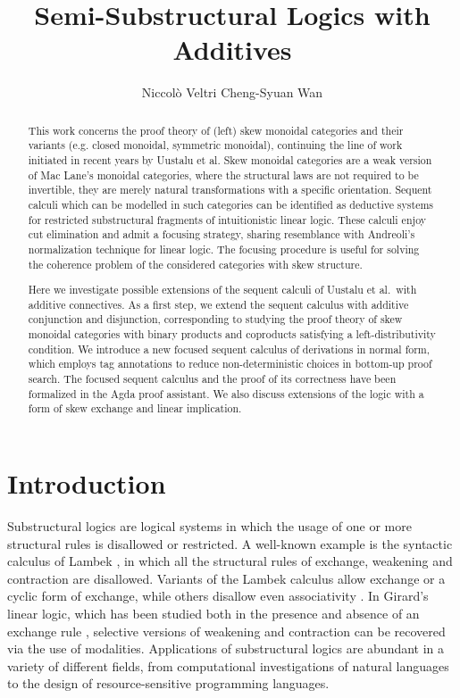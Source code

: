 \documentclass[submission,copyright,creativecommons]{eptcs}
\title{Semi-Substructural Logics with Additives}
\author{
Niccol{\`o} Veltri \qquad\qquad Cheng-Syuan Wan
\institute{Tallinn University of Technology, Estonia}
\email{\quad niccolo@cs.ioc.ee \quad\qquad cswan@cs.ioc.ee}
}
\theoremstyle{definition}
\begin{document}
\maketitle
\begin{abstract}
This work concerns the proof theory of (left) skew monoidal categories and their variants (e.g. closed monoidal, symmetric monoidal), continuing the line of work initiated in recent years by Uustalu et al.
Skew monoidal categories are a weak version of Mac Lane's monoidal categories, where the structural laws are not required to be invertible, they are merely natural transformations with a specific orientation. 
Sequent calculi which can be modelled in such categories can be identified as deductive systems for restricted substructural fragments of intuitionistic linear logic. These calculi enjoy cut elimination and admit a focusing strategy, sharing resemblance with Andreoli's normalization technique for linear logic. The focusing procedure is useful for solving the coherence problem of the considered categories with skew structure.

Here we investigate possible extensions of the sequent calculi of Uustalu et al.~with additive connectives. 
As a first step, we extend the sequent calculus with additive conjunction and disjunction, corresponding to studying the proof theory of skew monoidal categories with binary products and coproducts satisfying a left-distributivity condition. 
We introduce a new focused sequent calculus of derivations in normal form, which employs tag annotations to reduce non-deterministic choices in bottom-up proof search.
The focused sequent calculus and the proof of its correctness have been formalized in the Agda proof assistant.
We also discuss extensions of the logic with a form of skew exchange and linear implication.
\end{abstract}

\section{Introduction}

Substructural logics are logical systems in which the usage of one or more structural rules is disallowed or restricted. A well-known example is the syntactic calculus of Lambek \cite{lambek:mathematics:58}, in which all the structural rules of exchange, weakening and contraction are disallowed. Variants of the Lambek calculus allow exchange or a cyclic form of exchange, while others disallow even associativity \cite{moot:logic:12}. In Girard's linear logic, which has been studied both in the presence and absence of an exchange rule \cite{girard:linear:87,abrusci:noncommutative:1990}, selective versions of weakening and contraction can be recovered via the use of modalities. Applications of substructural logics are abundant in a variety of different fields, from computational investigations of natural languages to the design of resource-sensitive programming languages.
\end{document}
